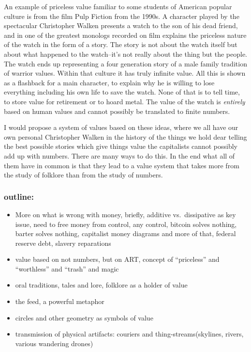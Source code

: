 An example of priceless value familiar to some students of American
popular culture is from the film Pulp Fiction from the 1990s. A
character played by the spectacular Christopher Walken presents a watch
to the son of his dead friend, and in one of the greatest monologs
recorded on film explains the priceless nature of the watch in the form
of a story. The story is not about the watch itself but about what
happened to the watch--it's not really about the thing but the people.
The watch ends up representing a four generation story of a male family
tradition of warrior values. Within that culture it has truly infinite
value. All this is shown as a flashback for a main character, to explain
why he is willing to lose everything including his own life to save the
watch. None of that is to tell time, to store value for retirement or to
hoard metal. The value of the watch is \emph{entirely} based on human
values and cannot possibly be translated to finite numbers.

I would propose a system of values based on these ideas, where we all
have our own personal Christopher Walken in the history of the things we
hold dear telling the best possible stories which give things value the
capitalists cannot possibly add up with numbers. There are many ways to
do this. In the end what all of them have in common is that they lead to
a value system that takes more from the study of folklore than from the
study of numbers.

\subsubsection{outline:}\label{outline}

\begin{itemize}
\tightlist
\item
  More on what is wrong with money, briefly, additive vs.~dissipative as
  key issue, need to free money from control, any control, bitcoin
  solves nothing, barter solves nothing, capitalist money diagrams and
  more of that, federal reserve debt, slavery reparations
\item
  value based on not numbers, but on ART, concept of ``priceless'' and
  ``worthless'' and ``trash'' and magic
\item
  oral traditions, tales and lore, folklore as a holder of value
\item
  the feed, a powerful metaphor
\item
  circles and other geometry as symbols of value
\item
  transmission of physical artifacts: couriers and
  thing-streams(skylines, rivers, various wandering drones)
\end{itemize}

